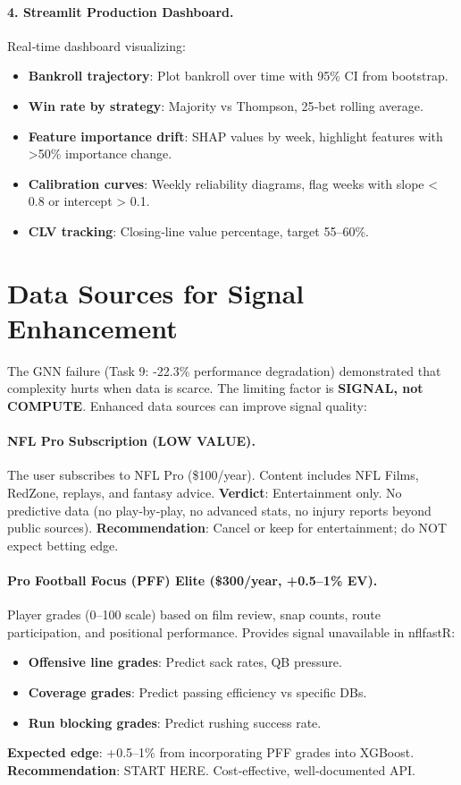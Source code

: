 \paragraph{4. Streamlit Production Dashboard.}
Real‑time dashboard visualizing:
\begin{itemize}
\item \textbf{Bankroll trajectory}: Plot bankroll over time with 95\% CI from bootstrap.
\item \textbf{Win rate by strategy}: Majority vs Thompson, 25‑bet rolling average.
\item \textbf{Feature importance drift}: SHAP values by week, highlight features with >50\% importance change.
\item \textbf{Calibration curves}: Weekly reliability diagrams, flag weeks with slope < 0.8 or intercept > 0.1.
\item \textbf{CLV tracking}: Closing‑line value percentage, target 55--60\%.
\end{itemize}

\section{Data Sources for Signal Enhancement}
\label{sec:data_sources}

The GNN failure (Task 9: -22.3\% performance degradation) demonstrated that complexity hurts when data is scarce. The limiting factor is \textbf{SIGNAL, not COMPUTE}. Enhanced data sources can improve signal quality:

\paragraph{NFL Pro Subscription (LOW VALUE).}
The user subscribes to NFL Pro (\$100/year). Content includes NFL Films, RedZone, replays, and fantasy advice. \textbf{Verdict}: Entertainment only. No predictive data (no play‑by‑play, no advanced stats, no injury reports beyond public sources). \textbf{Recommendation}: Cancel or keep for entertainment; do NOT expect betting edge.

\paragraph{Pro Football Focus (PFF) Elite (\$300/year, +0.5--1\% EV).}
Player grades (0--100 scale) based on film review, snap counts, route participation, and positional performance. Provides signal unavailable in nflfastR:
\begin{itemize}
\item \textbf{Offensive line grades}: Predict sack rates, QB pressure.
\item \textbf{Coverage grades}: Predict passing efficiency vs specific DBs.
\item \textbf{Run blocking grades}: Predict rushing success rate.
\end{itemize}
\textbf{Expected edge}: +0.5--1\% from incorporating PFF grades into XGBoost. \textbf{Recommendation}: START HERE. Cost‑effective, well‑documented API.

